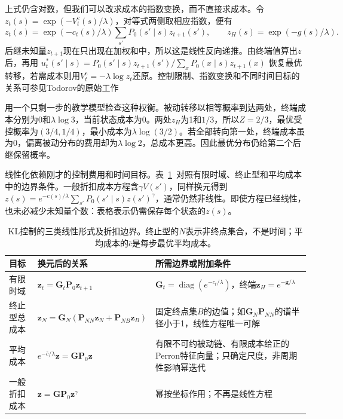 上式仍含对数，但我们可以改求成本的指数变换，而不直接求成本。令$z_t(s)=\exp(-V_t^{\mathrm c}(s)/\lambda)$，对等式两侧取相应指数，便有
\begin{equation}
 z_t(s)=\exp(-c_t(s)/\lambda)\sum_{s'}P_0(s'\mid s)z_{t+1}(s'),
 \qquad z_H(s)=\exp(-g(s)/\lambda).
 \label{eq:rl-planning-kl-linear}
\end{equation}
后继未知量$z_{t+1}$现在只出现在加权和中，所以这是线性反向递推。由终端值算出$z$后，再用
$u_t^*(s'\mid s)=P_0(s'\mid s)z_{t+1}(s')/\sum_xP_0(x\mid s)z_{t+1}(x)$
恢复最优转移，若需成本则用$V_t^{\mathrm c}=-\lambda\log z_t$还原。控制限制、指数变换和不同时间目标的关系可参见Todorov的原始工作

用一个只剩一步的教学模型检查这种权衡。被动转移以相等概率到达两处，终端成本分别为0和$\lambda\log3$，当前状态成本为0。两处$z_H$为1和$1/3$，所以$Z=2/3$，最优受控概率为$(3/4,1/4)$，最小成本为$\lambda\log(3/2)$。若全部转向第一处，终端成本虽为0，偏离被动分布的费用却为$\lambda\log2$，总成本更高。因此最优分布仍给第二个后继保留概率。

线性化依赖刚才的控制费用和时间目标。表~\ref{tab:rl-planning-kl-regimes}~对照有限时域、终止型和平均成本中的边界条件。一般折扣成本方程含$\gamma V(s')$，同样换元得到$z(s)=e^{-c(s)/\lambda}\sum_{s'}P_0(s'\mid s)z(s')^\gamma$，通常仍然非线性。即使方程已经线性，也未必减少未知量个数：表格表示仍需保存每个状态的$z(s)$。

\begin{table}[htbp]
 \centering
 \small
 \begin{tabularx}{\linewidth}{@{}l>{\raggedright\arraybackslash}X>{\raggedright\arraybackslash}X@{}}
  \toprule
  目标 & 换元后的关系 & 所需边界或附加条件\\
  \midrule
  有限时域 & $\bm z_t=\bm G_t\bm P_0\bm z_{t+1}$ & $\bm G_t=\operatorname{diag}(e^{-c_t/\lambda})$，终端$\bm z_H=e^{-\bm g/\lambda}$\\
  终止型总成本 & $\bm z_N=\bm G_N(\bm P_{NN}\bm z_N+\bm P_{NB}\bm z_B)$ & 固定终点集$B$的边值；如$\bm G_N\bm P_{NN}$的谱半径小于1，线性方程唯一可解\\
  平均成本 & $e^{-\bar c/\lambda}\bm z=\bm G\bm P_0\bm z$ & 有限不可约被动链、有限成本给正的Perron特征向量；只确定尺度，非周期性影响幂迭代\\
  一般折扣成本 & $\bm z=\bm G\bm P_0\bm z^\gamma$ & 幂按坐标作用；不再是线性方程\\
  \bottomrule
 \end{tabularx}
 \caption{KL控制的三类线性形式及折扣边界。终止型的$N$表示非终点集合，不是时间；平均成本的$\bar c$是每步最优平均成本。}
 \label{tab:rl-planning-kl-regimes}
\end{table}

